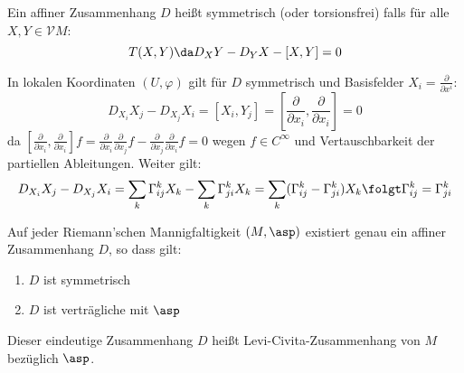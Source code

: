 \documentclass[a4paper,twoside,DIV15,BCOR12mm]{scrbook}
\newcommand{\V}{\mathcal V}
\begin{document}
\begin{definition}
Ein affiner Zusammenhang $D$ heißt symmetrisch (oder torsionsfrei) falls für alle $X,Y\in \V M$:
\[
T(X,Y) \da D_XY - D_YX - [X,Y] = 0
\]
\end{definition}

\begin{bemerkung}
In lokalen Koordinaten $(U,\varphi)$ gilt für $D$ symmetrisch und Basisfelder $X_i = \frac\partial{\partial x^i}$:
\[
D_{X_i} X_j - D_{X_j}X_i  = [X_i,Y_j] = \left[\frac{\partial}{\partial x_i},\frac{\partial}{\partial x_i}\right] = 0
\]
da $\left[\frac{\partial}{\partial x_i},\frac{\partial}{\partial x_i}\right] f = \frac{\partial}{\partial x_i} \frac{\partial}{\partial x_j} f - \frac{\partial}{\partial x_j} \frac{\partial}{\partial x_i} f = 0$ wegen $f\in C^\infty$ und Vertauschbarkeit der partiellen Ableitungen. Weiter gilt:
\[
D_{X_i} X_j - D_{X_j}X_i  = \sum_k \Gamma_{ij}^kX_k - \sum_k \Gamma_{ji}^kX_k = \sum_k( \Gamma_{ij}^k - \Gamma_{ji}^k) X_k \folgt \Gamma_{ij}^k = \Gamma_{ji}^k
\]
\end{bemerkung}

\begin{satz}
Auf jeder Riemann’schen Mannigfaltigkeit $(M,\asp)$ existiert genau ein affiner Zusammenhang $D$, so dass gilt:
\begin{enumerate}
\item $D$ ist symmetrisch
\item $D$ ist verträgliche mit $\asp$
\end{enumerate}
\end{satz}

Dieser eindeutige Zusammenhang $D$ heißt Levi-Civita-Zusammenhang von $M$ bezüglich $\asp$.
\end{document}
